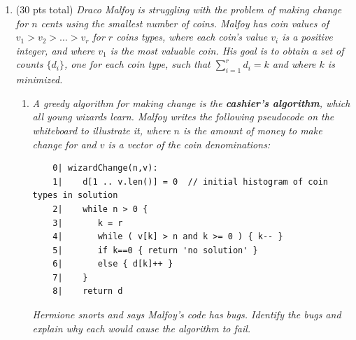 \documentclass[12pt]{article}
\begin{document}
\begin{enumerate}
\begin{enumerate}
\begin{center}
{
	}
	\end{center}

	\end{enumerate}


    \newpage
	\item (30 pts total) \textit{Draco Malfoy is struggling with the problem of making change for $n$ cents using the smallest number of coins. Malfoy has coin values of $v_{1}>v_{2}>\dots>v_{r}$ for $r$ coins types, where each 
coin's value $v_{i}$ is a positive integer, and where $v_{1}$ is the most valuable coin. His goal is to obtain a set of counts $\{d_{i}\}$, one for each coin type, such that $\sum_{i=1}^{r}d_{i}=k$ and where $k$ is minimized.}

	\begin{enumerate}

	\item \textit{A greedy algorithm for making change is the \textbf{cashier's algorithm}, which all young wizards learn. Malfoy writes the following pseudocode on the whiteboard to illustrate it, where $n$ is the amount of 
money to make change for and $v$ is a vector of the coin denominations:}
	\begin{small}
	\begin{verbatim}
	0| wizardChange(n,v):
	1|    d[1 .. v.len()] = 0  // initial histogram of coin types in solution
	2|    while n > 0 {
	3|       k = r
	4|       while ( v[k] > n and k >= 0 ) { k-- }
	5|       if k==0 { return 'no solution' }
	6|       else { d[k]++ }
	7|    }
	8|    return d
	\end{verbatim}
	\end{small}
	\textit{Hermione snorts and says Malfoy's code has bugs. Identify the bugs and explain why each would cause the algorithm to fail.}
	

\end{enumerate}
\end{enumerate}
\end{document}
